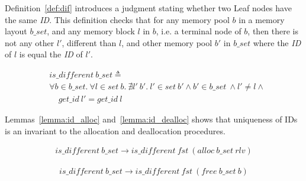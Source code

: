 Definition~\ref{def:dif} introduces a judgment stating whether two Leaf nodes have the same \emph{ID}. This definition checks that for any memory pool $b$ in a memory layout $b\_set$, and any memory block $l$ in $b$, i.e. a terminal node of $b$, then there is not any other $l'$, different than $l$, and other memory pool $b'$ in $b\_set$ where the \emph{ID} of $l$ is equal the \emph{ID} of $l'$.

\begin{definition} \label{def:dif}
{\footnotesize
	\begin{align*}
	&is\_different\ b\_set \triangleq \\
	&\forall b \in b\_set.\ \forall l \in set\ b.\ \nexists l'\ b'.\ l' \in set\ b' \wedge b' \in b\_set\ \wedge l' \ne l \wedge  \\
	&\ \ \ \ \ get\_id\ l' = get\_id\ l
	\end{align*}
}
\end{definition}

Lemmas~\ref{lemma:id_alloc} and~\ref{lemma:id_dealloc} shows that uniqueness of IDs is an invariant to the allocation and deallocation procedures.
%

\begin{lemma}  \label{lemma:id_alloc}
{\footnotesize
	\begin{align*}
	is\_different\ b\_set \longrightarrow is\_different\ fst\ (alloc\ b\_set\ rlv)
	\end{align*}
}
\end{lemma}


\begin{lemma}  \label{lemma:id_dealloc}
{\footnotesize
	\begin{align*}
	is\_different\ b\_set \longrightarrow is\_different\ fst\ (free\ b\_set\ b)
	\end{align*}
}
\end{lemma}


%

